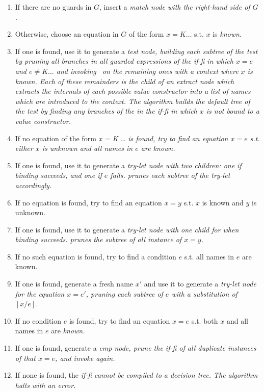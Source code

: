 \documentclass[manuscript,screen,review, 12pt, nonacm]{acmart}
\begin{document}
    \begin{enumerate}
        \item If there are no guards in $G$, insert a \it{match} node with the
        right-hand side of $G$. 
        \item Otherwise, choose an equation in $G$ of the form $x = K \dots$
        s.t. $x$ is \it{known}. 
        \item If one is found, use it to generate a \it{test} node, building
        each subtree of the \it{test} by pruning all branches in \it{all}
        guarded expressions of the \it{if-fi} in which $x = e$ and $e \neq K
        \dots$ and invoking \compile\ on the remaining ones with a context where
        $x$ is known. Each of these remainders is the child of an \it{extract}
        node which extracts the internals of each possible value constructor
        into a list of names which are introduced to the context. The algorithm
        builds the default tree of the \it{test} by finding any branches of the
        in the \it{if-fi} in which $x$ is not bound to a value constructor. 
        \item If no equation of the form \it{x = K \dots} is found, try to find
        an equation $x = e$ s.t. either $x$ is unknown and all names in $e$ are
        known. 
        \item If one is found, use it to generate a \it{try-let} node with two
        children: one if binding succeeds, and one if $e$ fails. \compile prunes
        each subtree of the \it{try-let} accordingly.
        \item If no equation is found, try to find an equation $x = y$ s.t. $x$
        is known and $y$ is unknown. 
        \item If one is found, use it to generate a \it{try-let} node with one
        child for when binding succeeds. \compile prunes the subtree of all 
        instance of $x = y$. 
        \item If no such equation is found, try to find a condition $e$ s.t. all
        names in $e$ are known. 
        \item If one is found, generate a fresh name $x'$ and use it to generate
        a \it{try-let} node for the equation $x = e'$, pruning each subtree of
        $e$ with a substitution of $[x/e]$. 
        \item If no condition $e$ is found, try to find an equation $x = e$ s.t.
        both $x$ and all names in $e$ are \it{known}.
        \item If one is found, generate a \it{cmp} node, prune the \it{if-fi} of
        all duplicate instances of that $x = e$, and invoke \compile again. 
        \item If none is found, the \it{if-fi} cannot be compiled to a decision
        tree. The algorithm halts with an error. 
    \end{enumerate}
    \raggedbottom
\end{document}
